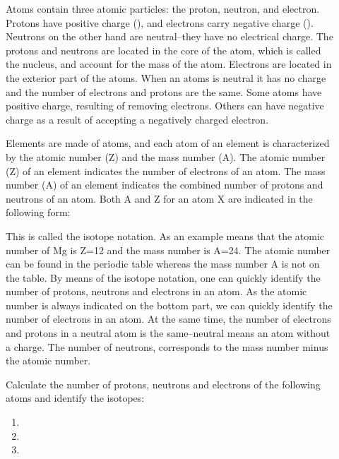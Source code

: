 \documentclass[main.tex]{subfiles}
\begin{document}
\sloppy
\begin{description}
\item[] 
Atoms contain three atomic particles: the proton, neutron, and electron. Protons have positive charge (\ce{+}), and electrons carry negative charge (\ce{-}). Neutrons on the other hand are neutral--they have no electrical charge. The protons and neutrons are located in the core of the atom, which is called the nucleus, and account for the mass of the atom. Electrons are located in the exterior part of the atoms. When an atoms is neutral it has no charge and the number of electrons and protons are the same. Some atoms have positive charge, resulting of removing electrons. Others can have negative charge as a result of accepting a negatively charged electron.
\item[] 
Elements are made of atoms, and each atom of an element is characterized by the atomic number (Z) and the mass number (A). The atomic number (Z) of an element indicates the number of electrons of an atom. The mass number (A) of an element indicates the combined number of protons and neutrons of an atom. Both A and Z for an atom X are indicated in the following form: 
\begin{center}\end{center} 
This is called the isotope notation. As an example   means that the atomic number of Mg is Z=12 and the mass number is A=24. The atomic number can be found in the periodic table whereas the mass number A is not on the table. By means of the isotope notation, one can quickly identify the number of protons, neutrons and electrons in an atom. As the atomic number is always indicated on the bottom part, we can quickly identify the number of electrons in an atom. At the same time, the number of electrons and protons in a neutral atom is the same--neutral means an atom without a charge. The number of neutrons, corresponds to the mass number minus the atomic number. 
\begin{example} %
Calculate the number of protons, neutrons and electrons of the following atoms and identify the isotopes:
\begin{multicols}{4}
\begin{enumerate}[label=(\alph*)]
\item {} 
\item {} 
\item {} 

\end{enumerate}
\end{multicols}
\end{example}
\end{description}
\end{document}
